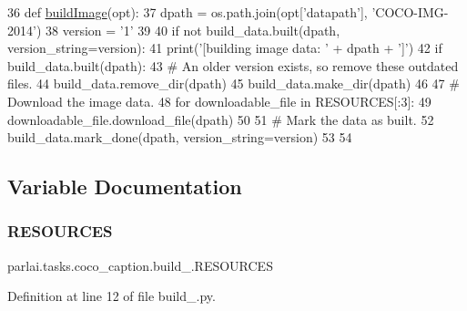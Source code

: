 \begin{DoxyCode}
36 \textcolor{keyword}{def }\hyperlink{namespaceparlai_1_1tasks_1_1coco__caption_1_1build__2014_acd8cdd7a90cf4d7d348184dd2ca1545b}{buildImage}(opt):
37     dpath = os.path.join(opt[\textcolor{stringliteral}{'datapath'}], \textcolor{stringliteral}{'COCO-IMG-2014'})
38     version = \textcolor{stringliteral}{'1'}
39 
40     \textcolor{keywordflow}{if} \textcolor{keywordflow}{not} build\_data.built(dpath, version\_string=version):
41         print(\textcolor{stringliteral}{'[building image data: '} + dpath + \textcolor{stringliteral}{']'})
42         \textcolor{keywordflow}{if} build\_data.built(dpath):
43             \textcolor{comment}{# An older version exists, so remove these outdated files.}
44             build\_data.remove\_dir(dpath)
45         build\_data.make\_dir(dpath)
46 
47         \textcolor{comment}{# Download the image data.}
48         \textcolor{keywordflow}{for} downloadable\_file \textcolor{keywordflow}{in} RESOURCES[:3]:
49             downloadable\_file.download\_file(dpath)
50 
51         \textcolor{comment}{# Mark the data as built.}
52         build\_data.mark\_done(dpath, version\_string=version)
53 
54 
\end{DoxyCode}


\subsection{Variable Documentation}
\mbox{\label{namespaceparlai_1_1tasks_1_1coco__caption_1_1build__2014_ac6125a0dca1889ebf466f2ea43e264c5}} 
\subsubsection{\texorpdfstring{R\+E\+S\+O\+U\+R\+C\+ES}{RESOURCES}}
{\footnotesize\ttfamily parlai.\+tasks.\+coco\+\_\+caption.\+build\+\_.\+R\+E\+S\+O\+U\+R\+C\+ES}



Definition at line 12 of file build\+\_.\+py.

